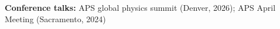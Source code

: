 \begin{cvparagraph}
\textbf{Conference talks:} APS global physics summit (Denver, 2026); APS April Meeting (Sacramento, 2024)
\end{cvparagraph}
